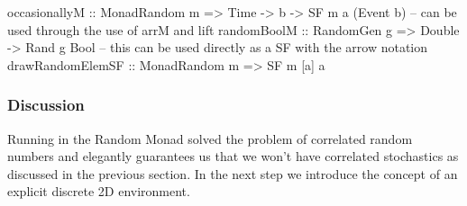 \begin{HaskellCode}
occasionallyM :: MonadRandom m => Time -> b -> SF m a (Event b)
-- can be used through the use of arrM and lift
randomBoolM :: RandomGen g => Double -> Rand g Bool
-- this can be used directly as a SF with the arrow notation
drawRandomElemSF :: MonadRandom m => SF m [a] a
\end{HaskellCode}

\subsubsection{Discussion} 
Running in the Random Monad solved the problem of correlated random numbers and elegantly guarantees us that we won't have correlated stochastics as discussed in the previous section. In the next step we introduce the concept of an explicit discrete 2D environment.